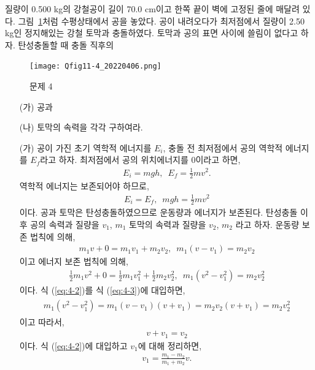 \documentclass[floatfix,nofootinbib,superscriptaddress,fleqn]{revtex4-2}
\begin{document}
질량이 0.500 kg의 강철공이 길이 70.0 cm이고 한쪽 끝이 벽에 고정된 줄에
매달려 있다. 그림~\ref{fig:4}처럼 수평상태에서 공을 놓았다. 공이
내려오다가 최저점에서 질량이 2.50 kg인 정지해있는 강철 토막과
충돌하였다. 토막과 공의 표면 사이에 쓸림이 없다고 하자. 
탄성충돌할 때 충돌 직후의 
\begin{figure}[ht]
  \centering
  \texttt{[image: Qfig11-4\_20220406.png]}
  \caption{문제 4}
  \label{fig:4}
\end{figure}
\begin{itemize}
\item[(가)] 공과 
\item[(나)] 토막의 속력을 각각 구하여라. 
\end{itemize}
\begin{itemize}
  \item[(가)] 공이 가진 초기 역학적 에너지를 $E_i$, 충돌 전 최저점에서 
공의 역학적 에너지를 $E_f$라고 하자. 최저점에서 공의 위치에너지를 0이라고 하면,
\begin{align}
  E_i = mgh,\,\,\, E_f=\frac{1}{2}mv^2.
\end{align}
역학적 에너지는 보존되어야 하므로,
\begin{align}\label{eq:4-1}
  E_i = E_f,\,\,\, mgh=\frac{1}{2}mv^2
\end{align}
이다. 공과 토막은 탄성충돌하였으므로 운동량과 에너지가 보존된다. 
탄성충돌 이후 공의 속력과 질량을 $v_1$, $m_1$ 토막의 속력과 질량을 $v_2$, $m_2$ 라고 
하자. 운동량 보존 법칙에 의해,
\begin{align}\label{eq:4-2}
  m_1v+0 = m_1v_1+m_2v_2,\,\,\,m_1(v-v_1)=m_2v_2
\end{align}
이고 에너지 보존 법칙에 의해,
\begin{align}\label{eq:4-3}
  \frac{1}{2}m_1v^2+0 = \frac{1}{2}m_1v_1^2+\frac{1}{2}m_2v_2^2
  ,\,\,\,  m_1(v^2-v_1^2) =m_2v_2^2
\end{align}
이다. 식 (\ref{eq:4-2})를 식 (\ref{eq:4-3})에 대입하면,
\begin{align}
  \begin{split}
    m_1(v^2-v^2_1)=m_1(v-v_1)(v+v_1)=m_2v_2(v+v_1)=m_2v_2^2
  \end{split}
\end{align}
이고 따라서,
\begin{align}\label{eq:4-4}
  v+v_1 = v_2
\end{align}
이다. 식 (\ref{eq:4-2})에 대입하고 $v_1$에 대해 정리하면,
\begin{align}
  v_1 = \frac{m_1-m_2}{m_1+m_2}v.

\end{align}
\end{itemize}
\end{document}
